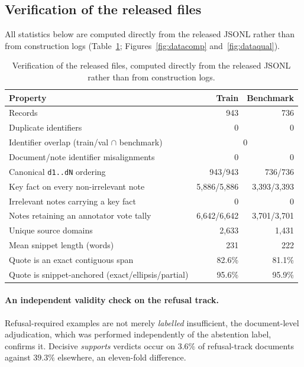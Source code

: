 \subsection{Verification of the released files}

All statistics below are computed directly from the released JSONL rather than
from construction logs (Table~\ref{tab:relverif}; Figures~\ref{fig:datacomp}
and~\ref{fig:dataqual}).

\begin{table}[htbp]\centering\small
\begin{tabular}{@{}lrr@{}}\toprule
\textbf{Property} & \textbf{Train} & \textbf{Benchmark}\\\midrule
Records & 943 & 736\\
Duplicate identifiers & 0 & 0\\
Identifier overlap (train/val $\cap$ benchmark) & \multicolumn{2}{c}{0}\\
Document/note identifier misalignments & 0 & 0\\
Canonical \texttt{d1..dN} ordering & 943/943 & 736/736\\
Key fact on every non-irrelevant note & 5{,}886/5{,}886 & 3{,}393/3{,}393\\
Irrelevant notes carrying a key fact & 0 & 0\\
Notes retaining an annotator vote tally & 6{,}642/6{,}642 & 3{,}701/3{,}701\\
Unique source domains & 2{,}633 & 1{,}431\\
Mean snippet length (words) & 231 & 222\\
Quote is an exact contiguous span & 82.6\% & 81.1\%\\
Quote is snippet-anchored (exact/ellipsis/partial) & 95.6\% & 95.9\%\\
\bottomrule\end{tabular}
\caption{Verification of the released files, computed directly from the released
JSONL rather than from construction logs.}
\label{tab:relverif}
\end{table}

\paragraph{An independent validity check on the refusal track.} Refusal-required
examples are not merely \emph{labelled} insufficient, the document-level
adjudication, which was performed independently of the abstention label,
confirms it. Decisive \textit{supports} verdicts occur on $3.6\%$ of refusal-track
documents against $39.3\%$ elsewhere, an eleven-fold difference.

